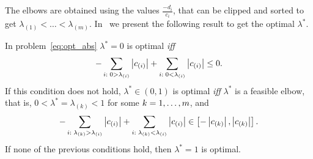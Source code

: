 The elbows are obtained using the values $\frac{-d_i}{c_i}$, that can be clipped and sorted to get ${\lambda}_{(1)} < \ldots < {\lambda}_{(m)}$.
In~\citet[Proposition 2]{RuizAD21} we present the following result to get the optimal $\lambda^*$.
\begin{proposition}\label{prop:abs_neurocom2020}
    In problem~\eqref{eq:opt_abs} $\lambda^*=0$ is optimal \emph{iff}
    \begin{equation}\nonumber
        - \sum_{i: \; 0 > \lambda_{(i)}} \left|c_{(i)}\right| + \sum_{i: \; 0 < \lambda_{(i)}} \left|c_{(i)}\right| \leq 0.
        \end{equation}
    If this condition does not hold, $\lambda^* \in (0,1)$ is optimal \emph{iff} $\lambda^*$ is a feasible elbow, that is, $0 < \lambda^* = \lambda_{(k)} < 1$ for some $k=1, \dotsc, m$, and
    \begin{equation}
    \nonumber    
    - \sum_{i:\; \lambda_{(k)} > \lambda_{(i)}} \left|c_{(i)}\right| + \sum_{i:\; \lambda_{(k)} < \lambda_{(i)}} \left|c_{(i)}\right| \in \left[ -  \left|c_{(k)}\right|,  \left|c_{(k)}\right|  \right] .
    \end{equation}
    If none of the previous conditions hold, then $\lambda^*=1$ is optimal.
\end{proposition}
